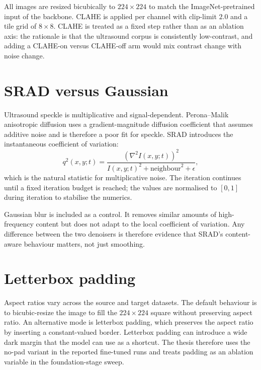 \documentclass[../preamble.tex]{subfiles}
\begin{document}
All images are resized bicubically to $224 \times 224$ to match the
ImageNet-pretrained input of the backbone. CLAHE is applied per channel with
clip-limit $2.0$ and a tile grid of $8 \times 8$. CLAHE is treated as a
fixed step rather than as an ablation axis: the rationale is that the
ultrasound corpus is consistently low-contrast, and adding a CLAHE-on versus
CLAHE-off arm would mix contrast change with noise change.

\section{SRAD versus Gaussian}
\label{sec:preproc-srad}

Ultrasound speckle is multiplicative and signal-dependent. Perona--Malik
anisotropic diffusion uses a gradient-magnitude diffusion coefficient that
assumes additive noise and is therefore a poor fit for speckle. SRAD
introduces the instantaneous coefficient of variation:
\begin{equation}
  q^2(x,y;t) = \frac{(\nabla^2 I(x,y;t))^2}{I(x,y;t)^2 + \text{neighbour}^2 + \epsilon},
  \label{eq:icov}
\end{equation}
which is the natural statistic for multiplicative noise. The iteration
continues until a fixed iteration budget is reached; the values are
normalised to $[0,1]$ during iteration to stabilise the numerics.

Gaussian blur is included as a control. It removes similar amounts of
high-frequency content but does not adapt to the local coefficient of
variation. Any difference between the two denoisers is therefore evidence
that SRAD's content-aware behaviour matters, not just smoothing.

\section{Letterbox padding}
\label{sec:preproc-padding}

Aspect ratios vary across the source and target datasets. The default
behaviour is to bicubic-resize the image to fill the $224 \times 224$ square
without preserving aspect ratio. An alternative mode is letterbox padding,
which preserves the aspect ratio by inserting a constant-valued border.
Letterbox padding can introduce a wide dark margin that the model can use as
a shortcut. The thesis therefore uses the no-pad variant in the reported
fine-tuned runs and treats padding as an ablation variable in the
foundation-stage sweep.
\end{document}
